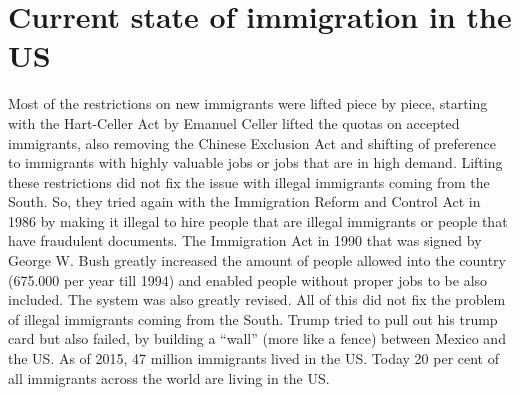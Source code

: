 \documentclass[12pt]{article}
\begin{document}
	\section{Current state of immigration in the US}
	Most of the restrictions on new immigrants were lifted piece by piece, starting with the Hart-Celler Act by Emanuel Celler lifted the quotas on accepted immigrants, also removing the Chinese Exclusion Act and shifting of preference to immigrants with highly valuable jobs or jobs that are in high demand. Lifting these restrictions did not fix the issue with illegal immigrants coming from the South. So, they tried again with the Immigration Reform and Control Act in 1986 by making it illegal to hire people that are illegal immigrants or people that have fraudulent documents. The Immigration Act in 1990 that was signed by George W. Bush greatly increased the amount of people allowed into the country (675.000 per year till 1994) and enabled people without proper jobs to be also included. The system was also greatly revised. All of this did not fix the problem of illegal immigrants coming from the South. Trump tried to pull out his trump card but also failed, by building a “wall” (more like a fence) between Mexico and the US. As of 2015, 47 million immigrants lived in the US. Today 20 per cent of all immigrants across the world are living in the US.
	
\end{document}

